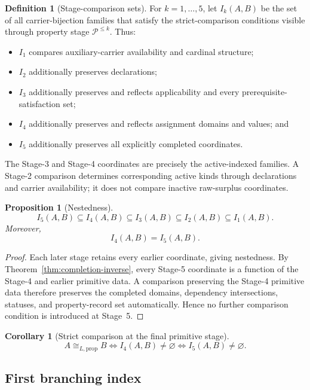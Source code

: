 \documentclass[11pt]{article}
\newtheorem{proposition}[theorem]{Proposition}
\newtheorem{corollary}[theorem]{Corollary}
\theoremstyle{definition}
\newtheorem{definition}[theorem]{Definition}
\theoremstyle{remark}
\begin{document}
\begin{definition}[Stage-comparison sets]
For \(k=1,\ldots,5\), let \(I_k(A,B)\) be the set of all carrier-bijection families that satisfy the strict-comparison conditions visible through property stage \(\mathcal P^{\le k}\).
Thus:
\begin{itemize}
\item \(I_1\) compares auxiliary-carrier availability and cardinal structure;
\item \(I_2\) additionally preserves declarations;
\item \(I_3\) additionally preserves and reflects applicability and every prerequisite-satisfaction set;
\item \(I_4\) additionally preserves and reflects assignment domains and values; and
\item \(I_5\) additionally preserves all explicitly completed coordinates.
\end{itemize}
The Stage-3 and Stage-4 coordinates are precisely the active-indexed
families. A Stage-2 comparison determines corresponding active kinds
through declarations and carrier availability; it does not compare
inactive raw-surplus coordinates.
\end{definition}

\begin{proposition}[Nestedness]
\[
I_5(A,B)\subseteq I_4(A,B)\subseteq I_3(A,B)\subseteq I_2(A,B)\subseteq I_1(A,B).
\]
Moreover,
\[
I_4(A,B)=I_5(A,B).
\]
\end{proposition}

\begin{proof}
Each later stage retains every earlier coordinate, giving nestedness.
By Theorem~\ref{thm:completion-inverse}, every Stage-5 coordinate is a function of the Stage-4 and earlier primitive data.
A comparison preserving the Stage-4 primitive data therefore preserves the completed domains, dependency intersections, statuses, and property-record set automatically.
Hence no further comparison condition is introduced at Stage~5.
\end{proof}

\begin{corollary}[Strict comparison at the final primitive stage]
\[
A\cong_{L,\mathrm{prop}}B
\Longleftrightarrow
I_4(A,B)\neq\varnothing
\Longleftrightarrow
I_5(A,B)\neq\varnothing.
\]
\end{corollary}

\subsection{First branching index}
\end{document}
